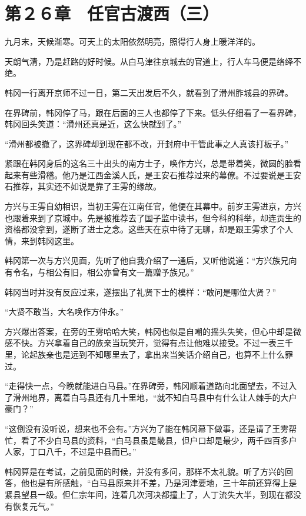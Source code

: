 \section{第２６章　任官古渡西（三）}

九月末，天候渐寒。可天上的太阳依然明亮，照得行人身上暖洋洋的。

天朗气清，乃是赶路的好时候。从白马津往京城去的官道上，行人车马便是络绎不绝。

韩冈一行离开京师不过一日，第二天出发后不久，就看到了滑州胙城县的界碑。

在界碑前，韩冈停了马，跟在后面的三人也都停了下来。低头仔细看了一看界碑，韩冈回头笑道：“滑州还真是近，这么快就到了。”

“滑州都被撤了，这界碑却到现在都不改，开封府中干管此事之人真该打板子。”

紧跟在韩冈身后的这名三十出头的南方士子，唤作方兴，总是带着笑，微圆的脸看起来有些滑稽。他乃是江西金溪人氏，是王安石推荐过来的幕僚。不过要说是王安石推荐，其实还不如说是靠了王雱的缘故。

方兴与王雱自幼相识，当初王雱在江南任官，他便在其幕中。前岁王雱进京，方兴也跟着来到了京城中。先是被推荐去了国子监中读书，但今科的科举，却连贡生的资格都没拿到，遂断了进士之念。这些天在京中待了无聊，却是跟王雱求了个人情，来到韩冈这里。

韩冈第一次与方兴见面，先听了他自我介绍了一通后，又听他说道：“方兴族兄向有令名，与相公有旧，相公亦曾有文一篇赠予族兄。”

韩冈当时并没有反应过来，遂摆出了礼贤下士的模样：“敢问是哪位大贤？”

“大贤不敢当，大名唤作方仲永。”

方兴爆出答案，在旁的王雱哈哈大笑，韩冈也似是自嘲的摇头失笑，但心中却是微感不快。方兴拿着自己的族亲当玩笑开，觉得有点让他难以接受。不过一表三千里，论起族亲也是远到不知哪里去了，拿出来当笑话介绍自己，也算不上什么罪过。

“走得快一点，今晚就能进白马县。”在界碑旁，韩冈顺着道路向北面望去，不过入了滑州地界，离着白马县还有几十里地，“就不知白马县中有什么让人棘手的大户豪门？”

“这倒没有没听说，想来也不会有。”方兴为了能在韩冈幕下做事，还是请了王雱帮忙，看了不少白马县的资料，“白马县虽是畿县，但户口却是最少，两千四百多户人家，丁口八千，不过是中县而已。”

韩冈算是在考试，之前见面的时候，并没有多问，那样不太礼貌。听了方兴的回答，他也是有所感触，“白马县原来并不差，乃是河津要地，三十年前还算得上是紧县望县一级。但仁宗年间，连着几次河决都撞上了，人丁流失大半，到现在都没有恢复元气。”

